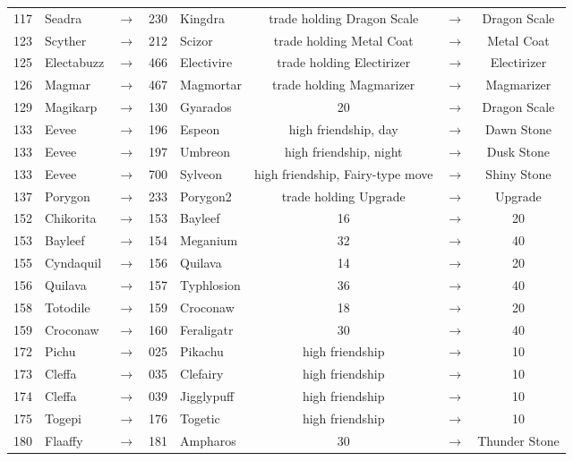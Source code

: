 \documentclass{article}
\begin{document}
\begin{longtable}{rlcrl|ccc}
117 & Seadra & $\rightarrow$ & 230 & Kingdra & trade holding Dragon Scale & $\rightarrow$ & Dragon Scale \\
123 & Scyther & $\rightarrow$ & 212 & Scizor & trade holding Metal Coat & $\rightarrow$ & Metal Coat \\
125 & Electabuzz & $\rightarrow$ & 466 & Electivire & trade holding Electirizer & $\rightarrow$ & Electirizer \\
126 & Magmar & $\rightarrow$ & 467 & Magmortar & trade holding Magmarizer & $\rightarrow$ & Magmarizer \\
129 & Magikarp & $\rightarrow$ & 130 & Gyarados & 20 & $\rightarrow$ & Dragon Scale \\
133 & Eevee & $\rightarrow$ & 196 & Espeon & high friendship, day & $\rightarrow$ & Dawn Stone \\
133 & Eevee & $\rightarrow$ & 197 & Umbreon & high friendship, night & $\rightarrow$ & Dusk Stone \\
133 & Eevee & $\rightarrow$ & 700 & Sylveon & high friendship, Fairy-type move & $\rightarrow$ & Shiny Stone \\
137 & Porygon & $\rightarrow$ & 233 & Porygon2 & trade holding Upgrade & $\rightarrow$ & Upgrade \\
\hline %
152 & Chikorita & $\rightarrow$ & 153 & Bayleef & 16 & $\rightarrow$ & 20 \\
153 & Bayleef & $\rightarrow$ & 154 & Meganium & 32 & $\rightarrow$ & 40 \\
155 & Cyndaquil & $\rightarrow$ & 156 & Quilava & 14 & $\rightarrow$ & 20 \\
156 & Quilava & $\rightarrow$ & 157 & Typhlosion & 36 & $\rightarrow$ & 40 \\
158 & Totodile & $\rightarrow$ & 159 & Croconaw & 18 & $\rightarrow$ & 20 \\
159 & Croconaw & $\rightarrow$ & 160 & Feraligatr & 30 & $\rightarrow$ & 40 \\
172 & Pichu & $\rightarrow$ & 025 & Pikachu & high friendship & $\rightarrow$ & 10 \\
173 & Cleffa & $\rightarrow$ & 035 & Clefairy & high friendship & $\rightarrow$ & 10 \\
174 & Cleffa & $\rightarrow$ & 039 & Jigglypuff & high friendship & $\rightarrow$ & 10 \\
175 & Togepi & $\rightarrow$ & 176 & Togetic & high friendship & $\rightarrow$ & 10 \\
180 & Flaaffy & $\rightarrow$ & 181 & Ampharos & 30 & $\rightarrow$ & Thunder Stone \\

\end{longtable}
\end{document}
